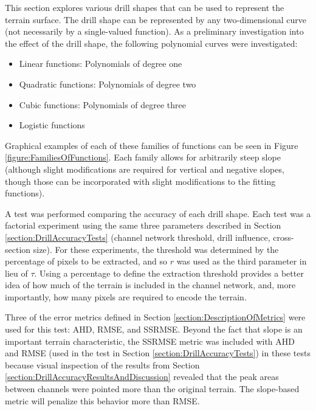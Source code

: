 This section explores various drill shapes that can be used to represent the terrain surface.
The drill shape can be represented by any two-dimensional curve (not necessarily by a single-valued function). 
As a preliminary investigation into the effect of the drill shape, the following polynomial curves were investigated:

\begin{itemize}
  \item Linear functions: Polynomials of degree one
  \item Quadratic functions: Polynomials of degree two
  \item Cubic functions: Polynomials of degree three
  \item Logistic functions
\end{itemize}


\noindent Graphical examples of each of these families of functions can be seen in Figure \ref{figure:FamiliesOfFunctions}. Each family allows for arbitrarily steep slope (although slight modifications are required for vertical and negative slopes, though those can be incorporated with slight modifications to the fitting functions). 

A test was performed comparing the accuracy of each drill shape. Each test was a factorial experiment using the same three parameters described in Section \ref{section:DrillAccuracyTests} (channel network threshold, drill influence, cross-section size). For these experiments, the threshold was determined by the percentage of pixels to be extracted, and so $r$ was used as the third parameter in lieu of $\tau$. Using a percentage to define the extraction threshold provides a better idea of how much of the terrain is included in the channel network, and, more importantly, how many pixels are required to encode the terrain.

Three of the error metrics defined in Section \ref{section:DescriptionOfMetrics} were used for this test: AHD, RMSE, and SSRMSE. Beyond the fact that slope is an important terrain characteristic, the SSRMSE metric was included with AHD and RMSE (used in the test in Section \ref{section:DrillAccuracyTests}) in these tests because visual inspection of the results from Section \ref{section:DrillAccuracyResultsAndDiscussion} revealed that the peak areas between channels were pointed more than the original terrain. The slope-based metric will penalize this behavior more than RMSE.

